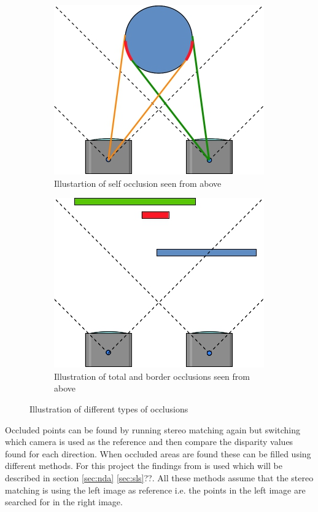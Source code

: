 \begin{figure}[ht!]
  \centering
  \begin{subfigure}[t]{0.45\textwidth}
    \centering\includegraphics[scale=0.4]{figures/occlself.jpg}
    \caption{Illustartion of self occlusion seen from above\label{fig:occlself}}
  \end{subfigure}\hspace{0.5cm}
  \begin{subfigure}[t]{0.45\textwidth}
    \centering\includegraphics[scale=0.4]{figures/occltotalborder}
    \caption{Illustration of total and border occlusions seen from above\label{fig:occltb}}
  \end{subfigure}
  \caption{Illustration of different types of occlusions\label{fig:occltypes}}
\end{figure}

Occluded points can be found by running stereo matching again but switching which camera is used as the reference and then compare the disparity values found for each direction. When occluded areas are found these can be filled using different methods. For this project the findings from \cite{huq2013occlusion} is used which will be described in section \vref{sec:nda} \vref{sec:sls}??. All these methods assume that the stereo matching is using the left image as reference i.e. the points in the left image are searched for in the right image. 

